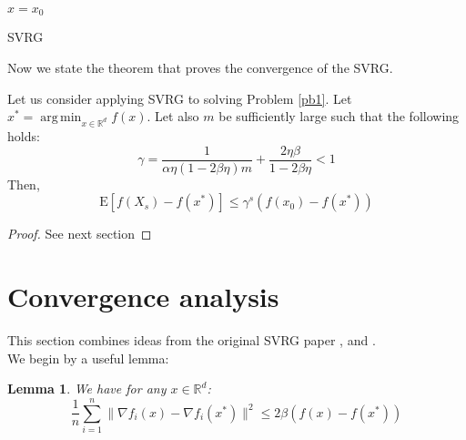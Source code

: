 \documentclass[12pt]{report}
\newtheorem{lemma}{Lemma}[section]
\newcounter{theo}[section]
\newenvironment{theo}[2][]{%
    \refstepcounter{theo}
\newcommand*{\defeq}{\mathrel{\vcenter{\baselineskip0.5ex \lineskiplimit0pt
                     \hbox{\scriptsize.}\hbox{\scriptsize.}}}%
                     =} 
 
\begin{mdframed}[]\relax}{%
\end{mdframed}}
\newcommand{\E}{\mathrm{E}}
\DeclareMathOperator*\argmin{arg\,min}
\begin{document}
\begin{algorithm}\label{SVRG}
    $x=x_0$\;
    \caption{SVRG}
\end{algorithm}

Now we state the theorem that proves the convergence of the SVRG.

\begin{theo}
LLet us consider applying SVRG to solving Problem \ref{pb1}.
Let $x^*=\argmin_{x\in\mathbb{R}^d} f(x)$.
Let also $m$ be sufficiently large such that the following holds:
\begin{equation}
    \gamma=\frac{1}{\alpha\eta(1-2\beta\eta)m}+\frac{2\eta\beta}{1-2\beta\eta}<1
\end{equation}   
Then,
\begin{equation}
    \E[f(X_s)-f(x^*)]\leq \gamma^s(f(x_0)-f(x^*))
\end{equation}


\end{theo}
\begin{proof}
See next section
\end{proof}
\section{Convergence analysis}
This section combines ideas from the original SVRG paper \cite{johnson2013accelerating}, \cite{bubeck2015convex} and  \cite{hu2018dissipativity}.
\\We begin by a useful lemma:
\begin{lemma}\label{lemma1}
We have for any $x\in\mathbb{R}^d$:
$$\frac{1}{n}\sum_{i=1}^n\|\nabla f_i(x)-\nabla f_i(x^*)\|^2\leq 2\beta(f(x)-f(x^*))$$
\end{lemma}
\end{document}
